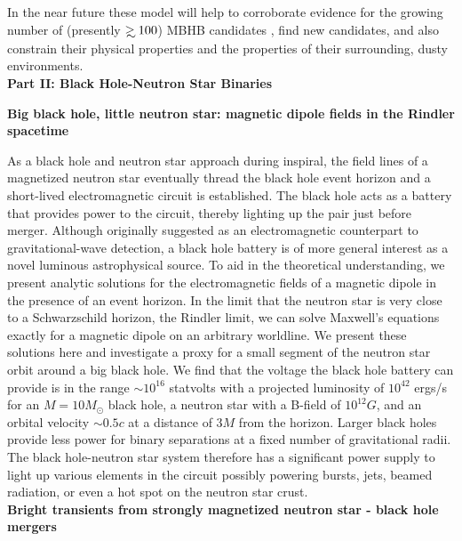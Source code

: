\documentclass[12pt,letterpaper]{article}
\begin{document}
In the near future these model will help to corroborate evidence for the
growing number of (presently $\gsim 100$) MBHB candidates \citep{Graham+2015b,
Charisi+2016}, find new candidates, and also constrain their physical
properties and the properties of their surrounding, dusty environments. \\

\clearpage
\noindent
\textbf{Part II: Black Hole-Neutron Star Binaries}

\noindent
\textbf{Big black hole, little neutron star: magnetic dipole fields in the Rindler spacetime}

As a black hole and neutron star approach during inspiral, the field lines of
a magnetized neutron star eventually thread the black hole event horizon and a
short-lived electromagnetic circuit is established. The black hole acts as a
battery that provides power to the circuit, thereby lighting up the pair just
before merger.  Although originally suggested as an electromagnetic
counterpart to gravitational-wave detection, a black hole battery is of more
general interest as a novel luminous astrophysical source. To aid in the
theoretical understanding, we present analytic solutions for the
electromagnetic fields of a magnetic dipole in the presence of an event
horizon. In the limit that the neutron star is very close to a Schwarzschild
horizon, the Rindler limit, we can solve Maxwell's equations exactly for a
magnetic dipole on an arbitrary worldline. We present these solutions here and
investigate a proxy for a small segment of the neutron star orbit around a big
black hole. We find that the voltage the black hole battery can provide is in
the range $\sim 10^{16}$ statvolts with a projected luminosity of $10^{42}$
ergs/s for an $M=10M_\odot$ black hole, a neutron star with a B-field of
$10^{12} G$, and an orbital velocity $\sim 0.5 c$ at a distance of $3M$ from
the horizon. Larger black holes provide less power for binary separations at a
fixed number of gravitational radii.  The black hole-neutron star system
therefore has a significant power supply to light up various elements in the
circuit possibly powering bursts, jets, beamed radiation, or even a hot spot
on the neutron star crust.\\

\noindent
\textbf{Bright transients from strongly magnetized neutron star - black hole mergers}
\end{document}
